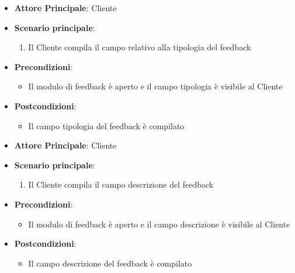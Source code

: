 \label{uc_23.1}
\begin{itemize}
    \item \textbf{Attore Principale}: Cliente
	\item \textbf{Scenario principale}:
	\begin{enumerate}
		\item Il Cliente compila il campo relativo alla tipologia del feedback
	\end{enumerate}
	\item \textbf{Precondizioni}:
	\begin{itemize}
		\item Il modulo di feedback è aperto e il campo tipologia è visibile al Cliente
	\end{itemize}
	\item \textbf{Postcondizioni}:
	\begin{itemize}
		\item Il campo tipologia del feedback è compilato
	\end{itemize}
\end{itemize}

\label{uc_23.2}
\begin{itemize}
    \item \textbf{Attore Principale}: Cliente
	\item \textbf{Scenario principale}:
	\begin{enumerate}
		\item Il Cliente compila il campo descrizione del feedback
	\end{enumerate}
	\item \textbf{Precondizioni}:
	\begin{itemize}
		\item Il modulo di feedback è aperto e il campo descrizione è visibile al Cliente
	\end{itemize}
	\item \textbf{Postcondizioni}:
	\begin{itemize}
		\item Il campo descrizione del feedback è compilato
	\end{itemize}
\end{itemize}

